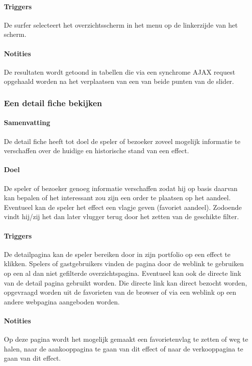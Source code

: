 \paragraph{Triggers} De surfer selecteert het overzichtsscherm in het menu op de linkerzijde van het scherm.
\paragraph{Notities} De resultaten wordt getoond in tabellen die via een synchrome AJAX request opgehaald worden na het verplaatsen van een van beide punten van de slider.

\subsubsection{Een detail fiche bekijken}
\paragraph{Samenvatting} De detail fiche heeft tot doel de speler of bezoeker zoveel mogelijk informatie te verschaffen over de huidige en historische stand van een effect.
\paragraph{Doel} De speler of bezoeker genoeg informatie verschaffen zodat hij op basis daarvan kan bepalen of het interessant zou zijn een order te plaatsen op het aandeel. Eventueel kan de speler het effect een vlagje geven (favoriet aandeel). Zodoende vindt hij/zij het dan later vlugger terug door het zetten van de geschikte filter.
\paragraph{Triggers} De detailpagina kan de speler bereiken door in zijn portfolio op een effect te klikken. Spelers of gastgebruikers vinden de pagina door de weblink te gebruiken op een al dan niet gefilterde overzichtspagina. Eventueel kan ook de directe link van de detail pagina gebruikt worden. Die directe link kan direct bezocht worden, opgevraagd worden uit de favorieten van de browser of via een weblink op een andere webpagina aangeboden worden.
\paragraph{Notities} Op deze pagina wordt het mogelijk gemaakt een favorietenvlag te zetten of weg te halen, naar de aankooppagina te gaan van dit effect of naar de verkooppagina te gaan van dit effect.



